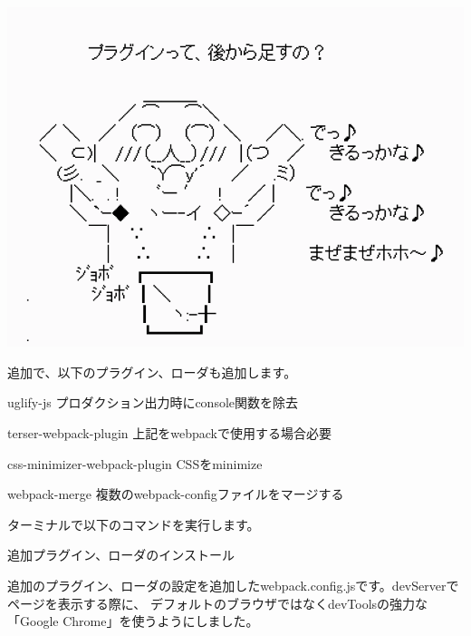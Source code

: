 {}\\[0pt]

\begin{reviewimage}[H]%
\includegraphics[width=0.7\maxwidth]{./images/02-create-react-app/plugins.png}%
\label{image:02-create-react-app:plugins}
\end{reviewimage}

追加で、以下のプラグイン、ローダも追加します。

\begin{starteritemize}
\item uglify{-}js プロダクション出力時にconsole関数を除去
\item terser{-}webpack{-}plugin 上記をwebpackで使用する場合必要
\item css{-}minimizer{-}webpack{-}plugin CSSをminimize
\item webpack{-}merge 複数のwebpack{-}configファイルをマージする
\end{starteritemize}

ターミナルで以下のコマンドを実行します。

\def\startercodeblockfontsize{}
\begin{starterterminal}[]{追加プラグイン、ローダのインストール}\end{starterterminal}

追加のプラグイン、ローダの設定を追加したwebpack.config.jsです。devServerでページを表示する際に、
デフォルトのブラウザではなくdevToolsの強力な「Google Chrome」を使うようにしました。

